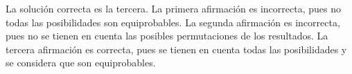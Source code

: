 \begin{solution}
  La solución correcta es la tercera. La primera afirmación es incorrecta, pues no todas las posibilidades son equiprobables. La segunda afirmación es incorrecta, pues no se tienen en cuenta las posibles permutaciones de los resultados. La tercera afirmación es correcta, pues se tienen en cuenta todas las posibilidades y se considera que son equiprobables.
\end{solution}

